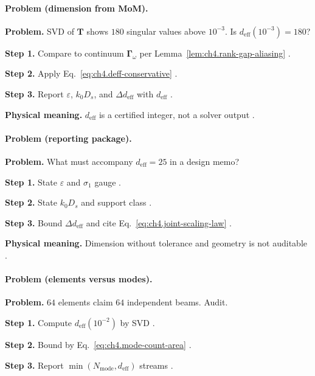 \paragraph{Problem (dimension from MoM).}
\textbf{Problem.} SVD of \(\mathbf{T}\) shows \(180\) singular values above \(10^{-3}\). Is \(d_{\mathrm{eff}}(10^{-3})=180\)?

\textbf{Step 1.} Compare to continuum \(\boldsymbol{\Gamma}_\omega\) per Lemma~\ref{lem:ch4.rank-gap-aliasing} \cite{harrington2001}.

\textbf{Step 2.} Apply Eq.~\eqref{eq:ch4.deff-conservative} \cite{hansen1988,devaney2004}.

\textbf{Step 3.} Report \(\varepsilon\), \(k_{0}D_{s}\), and \(\Delta d_{\mathrm{eff}}\) with \(d_{\mathrm{eff}}\) \cite{stratton1941}.

\textbf{Physical meaning.} \(d_{\mathrm{eff}}\) is a certified integer, not a solver output \cite{hansen1988}.

\paragraph{Problem (reporting package).}
\textbf{Problem.} What must accompany \(d_{\mathrm{eff}}=25\) in a design memo?

\textbf{Step 1.} State \(\varepsilon\) and \(\sigma_{1}\) gauge \cite{hansen1988}.

\textbf{Step 2.} State \(k_{0}D_{s}\) and support class \cite{jackson1999,stratton1941}.

\textbf{Step 3.} Bound \(\Delta d_{\mathrm{eff}}\) and cite Eq.~\eqref{eq:ch4.joint-scaling-law} \cite{harrington2001,devaney2004}.

\textbf{Physical meaning.} Dimension without tolerance and geometry is not auditable \cite{stratton1941}.

\paragraph{Problem (elements versus modes).}
\textbf{Problem.} \(64\) elements claim \(64\) independent beams. Audit.

\textbf{Step 1.} Compute \(d_{\mathrm{eff}}(10^{-2})\) by SVD \cite{harrington2001}.

\textbf{Step 2.} Bound by Eq.~\eqref{eq:ch4.mode-count-area} \cite{hansen1988,collin2001}.

\textbf{Step 3.} Report \(\min(N_{\mathrm{mode}},d_{\mathrm{eff}})\) streams \cite{devaney2004}.

